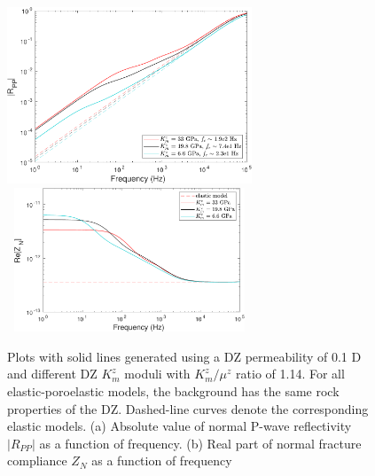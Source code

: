 \documentclass[draft]{agujournal2019}
\begin{document}
\begin{figure}
\centering
    \subcaptionbox{}
      {
       \includegraphics[width=73mm, height=43 mm]{figures/rt_dz_mod_perm1e-1d.pdf}
        }
    \subcaptionbox{}
      {
        \includegraphics[width=73mm, height=43mm]{figures/zn_dz_mod_perm1e-1d.pdf}
        }
\caption {Plots with solid lines generated using a DZ permeability of 0.1 D and different DZ  $K_m^z$ moduli with $K_m^z/\mu^z$ ratio of 1.14. For all elastic-poroelastic models, the background has the same rock properties of the DZ. Dashed-line curves denote the corresponding elastic models. (a) Absolute value of normal P-wave reflectivity $|R_{PP}|$ as a function of frequency. (b) Real part of normal fracture compliance $Z_N$ as a function of frequency}
\label{fig:8}
\end{figure}

\end{document}
